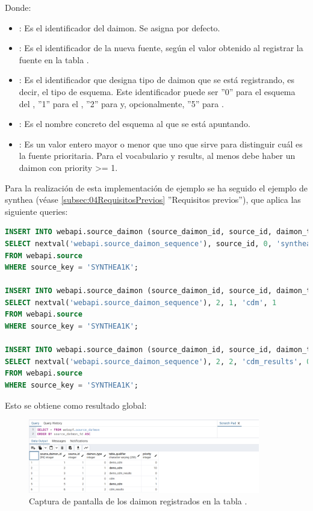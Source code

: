 \begin{enumerate}
    Donde:
    \begin{itemize}
        \item {}: Es el identificador del daimon. Se asigna por defecto.
        \item {}: Es el identificador de la nueva fuente, según el valor obtenido al registrar la fuente en la tabla .
        \item {}: Es el identificador que designa tipo de daimon que se está registrando, es decir, el tipo de esquema. Este identificador puede ser ''0'' para el esquema del , ''1'' para el , ''2'' para  y, opcionalmente, ''5'' para .
        \item {}: Es el nombre concreto del esquema al que se está apuntando.
        \item {}: Es un valor entero mayor o menor que uno que sirve para distinguir cuál es la fuente prioritaria. Para el vocabulario y results, al menos debe haber un daimon con priority >= 1.  
    \end{itemize}

    Para la realización de esta implementación de ejemplo se ha seguido el ejemplo de synthea (véase \ref{subsec:04RequisitosPrevios} ''Requisitos previos''), que aplica las siguiente queries:

\begin{lstlisting}[language=sql]
INSERT INTO webapi.source_daimon (source_daimon_id, source_id, daimon_type, table_qualifier, priority) 
SELECT nextval('webapi.source_daimon_sequence'), source_id, 0, 'synthea', 0
FROM webapi.source
WHERE source_key = 'SYNTHEA1K';

INSERT INTO webapi.source_daimon (source_daimon_id, source_id, daimon_type, table_qualifier, priority) 
SELECT nextval('webapi.source_daimon_sequence'), 2, 1, 'cdm', 1
FROM webapi.source
WHERE source_key = 'SYNTHEA1K';

INSERT INTO webapi.source_daimon (source_daimon_id, source_id, daimon_type, table_qualifier, priority) 
SELECT nextval('webapi.source_daimon_sequence'), 2, 2, 'cdm_results', 0
FROM webapi.source
WHERE source_key = 'SYNTHEA1K';
\end{lstlisting}

    Esto se obtiene como resultado global:

\begin{figure}[H]
    \centering
    \includegraphics[width=0.90\textwidth]{figures/queryDaimon.png}
    \caption{Captura de pantalla de los daimon registrados en la tabla .}
    \label{fig:queryDaimon}
\end{figure}


\end{enumerate}
